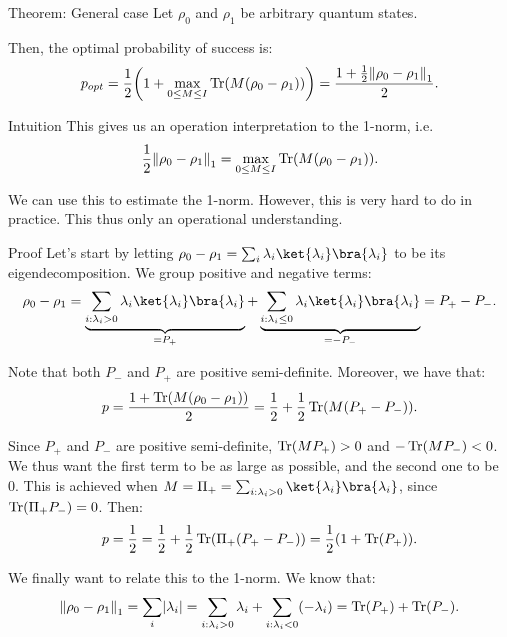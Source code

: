 \documentclass[a4paper]{article}
\begin{document}
\begin{parag}{Theorem: General case}
    Let $\rho_0$ and $\rho_1$ be arbitrary quantum states.

    Then, the optimal probability of success is: 
    \[p_{opt} = \frac{1}{2}\left(1 + \max_{0 \leq M \leq I} \Tr\left(M\left(\rho_0 - \rho_1\right)\right)\right) = \frac{1 + \frac{1}{2} \left\|\rho_0 - \rho_1\right\|_1}{2}.\]

    \begin{subparag}{Intuition}
        This gives us an operation interpretation to the 1-norm, i.e. 
        \[\frac{1}{2} \left\|\rho_0 - \rho_1\right\|_1 = \max_{0 \leq M \leq I} \Tr\left(M \left(\rho_0 - \rho_1\right)\right).\]

        We can use this to estimate the 1-norm. However, this is very hard to do in practice. This thus only an operational understanding.
    \end{subparag}

    \begin{subparag}{Proof}
        Let's start by letting $\rho_0 - \rho_1 = \sum_{i} \lambda_i \ket{\lambda_i}\bra{\lambda_i}$ to be its eigendecomposition. We group positive and negative terms: 
        \[\rho_0 - \rho_1 = \underbrace{\sum_{i: \lambda_i > 0} \lambda_i \ket{\lambda_i}\bra{\lambda_i}}_{= P_+} + \underbrace{\sum_{i: \lambda_i \leq 0} \lambda_i \ket{\lambda_i}\bra{\lambda_i}}_{= -P_-} = P_+ - P_-.\]

        Note that both $P_-$ and $P_+$ are positive semi-definite. Moreover, we have that: 
        \[p = \frac{1 + \Tr\left(M \left(\rho_0 - \rho_1\right)\right)}{2} = \frac{1}{2} + \frac{1}{2} \Tr\left(M\left(P_+ - P_-\right)\right).\]
        
        Since $P_+$ and $P_-$ are positive semi-definite, $\Tr\left(M P_+\right) > 0$ and $-\Tr\left(M P_-\right) < 0$. We thus want the first term to be as large as possible, and the second one to be 0. This is achieved when $M = \Pi_+ = \sum_{i: \lambda_i > 0} \ket{\lambda_i}\bra{\lambda_i}$, since $\Tr\left(\Pi_+ P_-\right) = 0$. Then:
        \[p = \frac{1}{2} = \frac{1}{2} + \frac{1}{2} \Tr\left(\Pi_+ \left(P_+ - P_-\right)\right) = \frac{1}{2}\left(1 + \Tr\left(P_+\right)\right).\]
        
        We finally want to relate this to the 1-norm. We know that: 
        \[\left\|\rho_0 - \rho_1\right\|_1 = \sum_{i} \left|\lambda_i\right| = \sum_{i: \lambda_i > 0} \lambda_i + \sum_{i: \lambda_i < 0} \left(-\lambda_i\right) = \Tr\left(P_+\right) + \Tr\left(P_-\right).\]


\end{subparag}
\end{parag}
\end{document}
